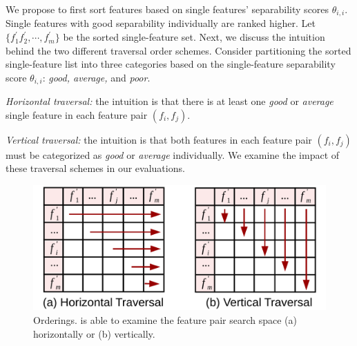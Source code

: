  We propose to first sort features based on single features' separability scores $\theta_{i,i}$. Single features with good separability individually are ranked higher. Let $\{f_1^{'} f_2^{'},\cdots,f_m^{'}\}$ be the sorted single-feature set. Next, we discuss the intuition behind the two different traversal order schemes. Consider partitioning the sorted single-feature list into three categories based on the single-feature separability score $\theta_{i,i}$: {\em good, average,} and {\em poor}.
\squishlist
\item \emph{Horizontal traversal:} the intuition is that there is at least one {\em good} or {\em average} single feature in each \topk feature pair $(f_i,f_j)$.
\item \emph{Vertical traversal:} the intuition is that both features in each \topk feature pair $(f_i,f_j)$ must be categorized as {\em good} or {\em average} individually.
\squishend
\noindent We examine the impact of these traversal schemes in our evaluations.


\begin{figure}[h]
 \centering
 \vspace{-5mm}
 \includegraphics[width=0.85\linewidth]{fig/traversal.pdf}
 \vspace{-5mm}
\caption{\traversal Orderings. \genviz is able to examine the feature pair search space (a) horizontally or (b) vertically.}
\vspace{-5mm}
\label{fig:traversal}
\end{figure}

